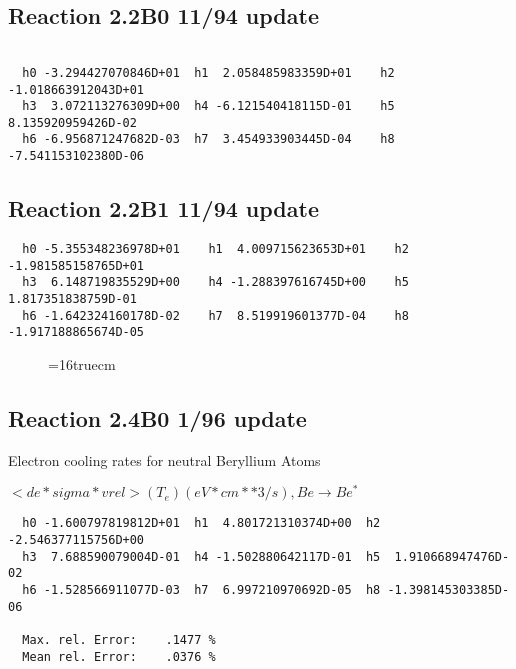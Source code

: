 \documentclass[12pt]{article}
\begin{document}
\subsection{
Reaction 2.2B0                    11/94 update
}

\begin{small}\begin{verbatim}

  h0 -3.294427070846D+01  h1  2.058485983359D+01    h2 -1.018663912043D+01
  h3  3.072113276309D+00  h4 -6.121540418115D-01    h5  8.135920959426D-02
  h6 -6.956871247682D-03  h7  3.454933903445D-04    h8 -7.541153102380D-06
\end{verbatim}\end{small}

\subsection{
Reaction 2.2B1                    11/94 update
}


\begin{small}\begin{verbatim}
  h0 -5.355348236978D+01    h1  4.009715623653D+01    h2 -1.981585158765D+01
  h3  6.148719835529D+00    h4 -1.288397616745D+00    h5  1.817351838759D-01
  h6 -1.642324160178D-02    h7  8.519919601377D-04    h8 -1.917188865674D-05
\end{verbatim}\end{small}

\begin{figure} \label{e2.2B}
\epsfxsize=16truecm
\end{figure}
\newpage

\subsection{
Reaction 2.4B0                     1/96 update
}

  Electron cooling rates for neutral
  Beryllium Atoms

 $<de*sigma*vrel>(T_e)  (eV*cm**3/s), Be  \rightarrow Be^*$

\begin{small}\begin{verbatim}
  h0 -1.600797819812D+01  h1  4.801721310374D+00  h2 -2.546377115756D+00
  h3  7.688590079004D-01  h4 -1.502880642117D-01  h5  1.910668947476D-02
  h6 -1.528566911077D-03  h7  6.997210970692D-05  h8 -1.398145303385D-06

  Max. rel. Error:    .1477 %
  Mean rel. Error:    .0376 %

\end{verbatim}\end{small}
\end{document}
